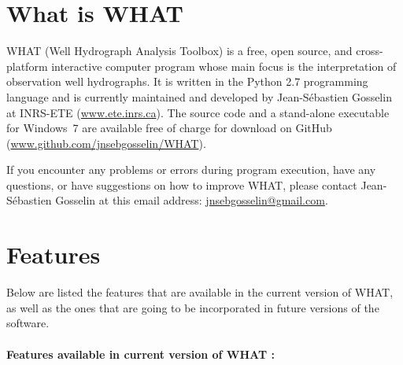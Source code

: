 \documentclass[WHATMANUAL.tex]{subfiles}
\begin{document}
\section{What is WHAT}

WHAT (Well Hydrograph Analysis Toolbox) is a free, open source, and cross-platform interactive computer program whose main focus is the interpretation of observation well hydrographs. It is written in the Python 2.7 programming language and is currently maintained and developed by Jean-Sébastien Gosselin at INRS-ETE (\url{www.ete.inrs.ca}). The source code and a stand-alone executable for Windows~7 are available free of charge for download on GitHub (\url{www.github.com/jnsebgosselin/WHAT}).

If you encounter any problems or errors during program execution, have any questions, or have suggestions on how to improve WHAT, please contact Jean-Sébastien Gosselin at this email address: \href{mailto:jnsebgosselin@gmail.com}{jnsebgosselin@gmail.com}.

\section{Features}

Below are listed the features that are available in the current version of WHAT, as well as the ones that are going to be incorporated in future versions of the software.

\paragraph*{Features available in current version of WHAT :}
\end{document}

